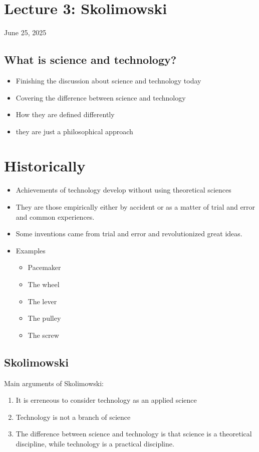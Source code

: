 \documentclass{article}
\begin{document}
\section{Lecture 3: Skolimowski}
June 25, 2025

\subsection{What is science and technology?}
\begin{itemize}
  \item Finishing the discussion about
    science and technology today
  \item Covering the difference between
    science and technology
  \item How they are defined differently
  \item they are just a philosophical approach
\end{itemize}

\section*{Historically}
\begin{itemize}
  \item Achievements of technology develop without using
    theoretical sciences
  \item They are those empirically either by accident or as a matter of
    trial and error and common experiences.
  \item Some inventions came from trial and error and
    revolutionized great ideas.
  \item Examples
    \begin{itemize}
      \item Pacemaker
      \item The wheel
      \item The lever
      \item The pulley
      \item The screw
    \end{itemize}
\end{itemize}

\subsection{Skolimowski}
Main arguments of Skolimowski:
\begin{enumerate}
  \item It is erreneous to consider technology as an applied science
  \item Technology is not a branch of science
  \item The difference between science and technology is
    that science is a theoretical discipline, while technology is a practical
    discipline.
\end{enumerate}
\end{document}
